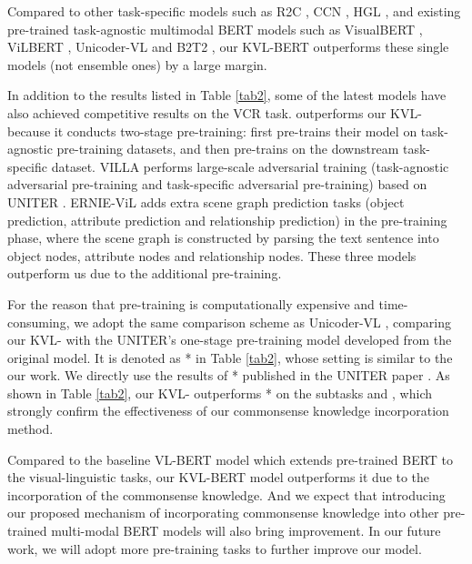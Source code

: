\documentclass[conference]{IEEEtran}
\begin{document}
Compared to other task-specific models such as R2C \cite{b10}, CCN \cite{b17}, HGL \cite{b18}, and existing pre-trained task-agnostic multimodal BERT models such as VisualBERT \cite{b12}, ViLBERT \cite{b13}, Unicoder-VL \cite{b19} and B2T2 \cite{b15}, our KVL-BERT outperforms these single models (not ensemble ones) by a large margin. 

In addition to the results listed in Table \ref{tab2}, some of the latest models have also achieved competitive results on the VCR task.  \cite{b20} outperforms our KVL- because it conducts two-stage pre-training: first pre-trains their model on task-agnostic pre-training datasets, and then pre-trains on the downstream task-specific dataset. VILLA \cite{gan2020large} performs large-scale adversarial training (task-agnostic adversarial pre-training and task-specific adversarial pre-training) based on UNITER \cite{b20}. ERNIE-ViL \cite{yu2020ernie} adds extra scene graph prediction tasks (object prediction, attribute prediction and relationship prediction) in the pre-training phase, where the scene graph is constructed by parsing the text sentence into object nodes, attribute nodes and relationship nodes. These three models outperform us due to the additional pre-training.






For the reason that pre-training is computationally expensive and time-consuming, we adopt the same comparison scheme as Unicoder-VL \cite{b19}, comparing our KVL- with the UNITER's one-stage pre-training model developed from the original  model. It is denoted as * in Table \ref{tab2}, whose setting is similar to the our work. We directly use the results of * published in the UNITER paper \cite{b20}. As shown in Table \ref{tab2}, our KVL- outperforms * on the subtasks  and , which strongly confirm the effectiveness of our commonsense knowledge incorporation method. 

Compared to the baseline VL-BERT model which extends pre-trained BERT to the visual-linguistic tasks, our KVL-BERT model outperforms it due to the incorporation of the commonsense knowledge. And we expect that introducing our proposed mechanism of incorporating commonsense knowledge into other pre-trained multi-modal BERT models will also bring improvement. In our future work, we will adopt more pre-training tasks to further improve our model.
 
 
 
\end{document}
